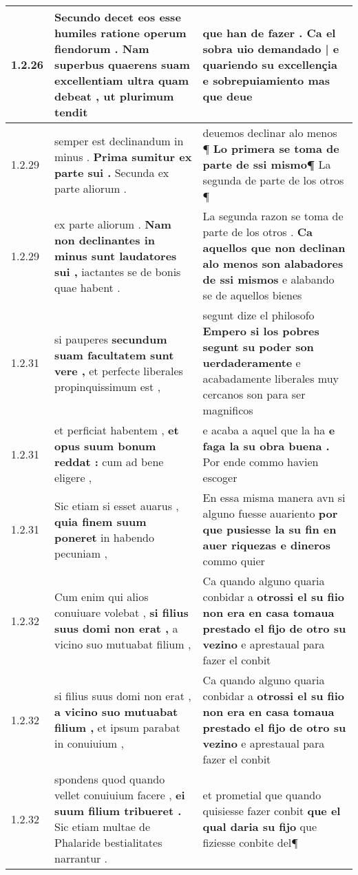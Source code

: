 \begin{tabular}{|p{1cm}|p{6.5cm}|p{6.5cm}|}
1.2.26 & Secundo decet eos esse humiles ratione operum fiendorum . \textbf{ Nam superbus quaerens suam excellentiam ultra quam debeat , } ut plurimum tendit & que han de fazer . \textbf{ Ca el sobra uio demandado | e quariendo su excellençia e sobrepuiamiento } mas que deue \\\hline
1.2.29 & semper est declinandum in minus . \textbf{ Prima sumitur ex parte sui . } Secunda ex parte aliorum . & deuemos declinar alo menos ¶ \textbf{ Lo primera se toma de parte de ssi mismo¶ } La segunda de parte de los otros ¶ \\\hline
1.2.29 & ex parte aliorum . \textbf{ Nam non declinantes in minus sunt laudatores sui , } iactantes se de bonis quae habent . & La segunda razon se toma de parte de los otros . \textbf{ Ca aquellos que non declinan alo menos son alabadores de ssi mismos } e alabando se de aquellos bienes \\\hline
1.2.31 & si pauperes \textbf{ secundum suam facultatem sunt vere , } et perfecte liberales propinquissimum est , & segunt dize el philosofo \textbf{ Empero si los pobres segunt su poder son uerdaderamente } e acabadamente liberales muy cercanos son para ser magnificos \\\hline
1.2.31 & et perficiat habentem , \textbf{ et opus suum bonum reddat : } cum ad bene eligere , & e acaba a aquel que la ha \textbf{ e faga la su obra buena . } Por ende commo havien escoger \\\hline
1.2.31 & Sic etiam si esset auarus , \textbf{ quia finem suum poneret } in habendo pecuniam , & En essa misma manera avn si alguno fuesse auariento \textbf{ por que pusiesse la su fin en auer riquezas e dineros } commo quier \\\hline
1.2.32 & Cum enim qui alios conuiuare volebat , \textbf{ si filius suus domi non erat , } a vicino suo mutuabat filium , & Ca quando alguno quaria conbidar a \textbf{ otrossi el su fiio non era en casa tomaua prestado el fijo de otro su vezino } e aprestaual para fazer el conbit \\\hline
1.2.32 & si filius suus domi non erat , \textbf{ a vicino suo mutuabat filium , } et ipsum parabat in conuiuium , & Ca quando alguno quaria conbidar a \textbf{ otrossi el su fiio non era en casa tomaua prestado el fijo de otro su vezino } e aprestaual para fazer el conbit \\\hline
1.2.32 & spondens quod quando vellet conuiuium facere , \textbf{ ei suum filium tribueret . } Sic etiam multae de Phalaride bestialitates narrantur . & et prometial que quando quisiesse fazer conbit \textbf{ que el qual daria su fijo } que fiziesse conbite del¶ \\\hline

\end{tabular}
